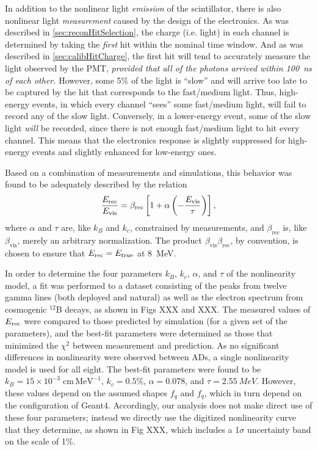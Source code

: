 \documentclass[../thesis.tex]{subfiles}
\begin{document}
In addition to the nonlinear light \emph{emission} of the scintillator, there is also nonlinear light \emph{measurement} caused by the design of the electronics. As was described in \autoref{sec:reconHitSelection}, the charge (i.e. light) in each channel is determined by taking the \emph{first} hit within the nominal time window. And as was described in \autoref{sec:calibHitCharge}, the first hit will tend to accurately measure the light observed by the PMT, \emph{provided that all of the photons arrived within 100~ns of each other.} However, some 5\% of the light is ``slow'' and will arrive too late to be captured by the hit that corresponds to the fast/medium light. Thus, high-energy events, in which every channel ``sees'' some fast/medium light, will fail to record any of the slow light. Conversely, in a lower-energy event, some of the slow light \emph{will} be recorded, since there is not enough fast/medium light to hit every channel. This means that the electronics response is slightly suppressed for high-energy events and slightly enhanced for low-energy ones.

Based on a combination of measurements and simulations, this behavior was found to be adequately described by the relation
\begin{equation*}
  \frac{E_\mathrm{rec}}{E_\mathrm{vis}} = \beta_{\mathrm{rec}}\left[ 1 + \alpha \left( - \frac{E_\mathrm{vis}}{\tau} \right) \right],
\end{equation*}
where $\alpha$ and $\tau$ are, like $k_B$ and $k_c$, constrained by measurements, and $\beta_{\mathrm{rec}}$ is, like $\beta_{\mathrm{vis}}$, merely an arbitrary normalization. The product $\beta_{\mathrm{vis}}\beta_{\mathrm{rec}}$, by convention, is chosen to ensure that $E_\mathrm{rec} = E_\mathrm{true}$ at 8~MeV.

In order to determine the four parameters $k_B$, $k_c$, $\alpha$, and $\tau$ of the nonlinearity model, a fit was performed to a dataset consisting of the peaks from twelve gamma lines (both deployed and natural) as well as the electron spectrum from cosmogenic $^{12}$B decays, as shown in Figs XXX and XXX. The measured values of $E_\mathrm{rec}$ were compared to those predicted by simulation (for a given set of the parameters), and the best-fit parameters were determined as those that minimized the $\chi^2$ between measurement and prediction. As no significant differences in nonlinearity were observed between ADs, a single nonlinearity model is used for all eight. The best-fit parameters were found to be $k_B = 15 \times 10^{-3}\;\mathrm{cm\, MeV^{-1}}$, $k_c = 0.5\%$, $\alpha = 0.078$, and $\tau = \SI{2.55}{MeV}$. However, these values depend on the assumed shapes $f_q$ and $f_q$, which in turn depend on the configuration of Geant4. Accordingly, our analysis does not make direct use of these four parameters; instead we directly use the digitized nonlinearity curve that they determine, as shown in Fig XXX, which includes a 1$\sigma$ uncertainty band on the scale of 1\%.
\end{document}
